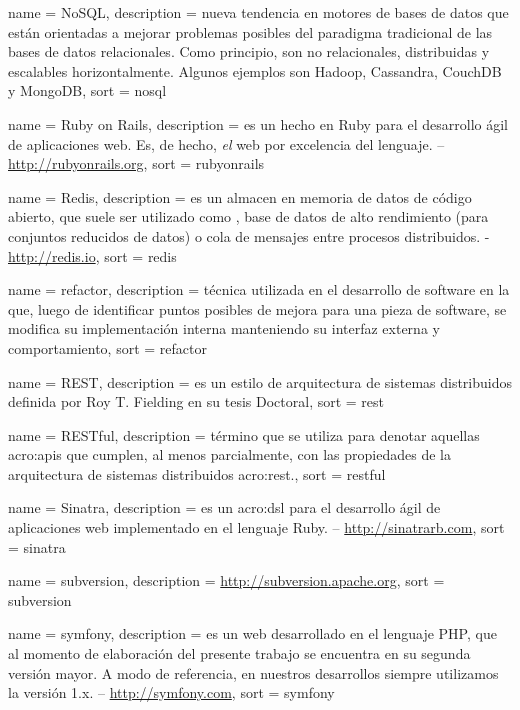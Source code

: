  {
  name = {NoSQL},
  description = {nueva tendencia en motores de bases de datos que están orientadas a mejorar problemas posibles del paradigma tradicional de las bases de datos relacionales. Como principio, son no relacionales, distribuidas y escalables horizontalmente. Algunos ejemplos son Hadoop, Cassandra, CouchDB y MongoDB},
  sort = {nosql}
}

 {
  name = {Ruby on Rails},
  description = {es un  hecho en Ruby para el desarrollo ágil de aplicaciones web. Es, de hecho, \textit{el}  web por excelencia del lenguaje. – \url{http://rubyonrails.org}},
  sort = {rubyonrails}
}

 {
  name = {Redis},
  description = {es un almacen en memoria de datos de código abierto, que suele ser utilizado como , base de datos de alto rendimiento (para conjuntos reducidos de datos) o cola de mensajes entre procesos distribuidos. - \url{http://redis.io}},
  sort = {redis}
}

 {
  name = {refactor},
  description = {técnica utilizada en el desarrollo de software en la que, luego de identificar puntos posibles de mejora para una pieza de software, se modifica su implementación interna manteniendo su interfaz externa y comportamiento},
  sort = {refactor}
}

 {
  name = {REST},
  description = {es un estilo de arquitectura de sistemas distribuidos definida por Roy T. Fielding en su tesis Doctoral},
  sort = {rest}
}

 {
  name = {RESTful},
  description = {término que se utiliza para denotar aquellas \glspl{acro:api} que cumplen, al menos parcialmente, con las propiedades de la arquitectura de sistemas distribuidos \gls{acro:rest}.},
  sort = {restful}
}

 {
  name = {Sinatra},
  description = {es un \gls{acro:dsl} para el desarrollo ágil de aplicaciones web implementado en el lenguaje Ruby. – \url{http://sinatrarb.com}},
  sort = {sinatra}
}

 {
  name = {subversion},
  description = {\url{http://subversion.apache.org}},
  sort = {subversion}
}

 {
  name = {symfony},
  description = {es un  web desarrollado en el lenguaje PHP, que al momento de elaboración del presente trabajo se encuentra en su segunda versión mayor. A modo de referencia, en nuestros desarrollos siempre utilizamos la versión 1.x. – \url{http://symfony.com}},
  sort = {symfony}
}

